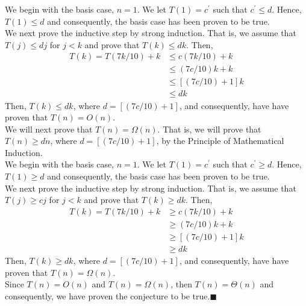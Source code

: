 \documentclass{article}
\begin{document}
\begin{adjustwidth}{2.5em}{0pt}
We begin with the basis case, $n = 1$. We let $T(1) = c^\prime$ such that $c^\prime \leq d$. Hence, $T(1) \leq d$ and consequently, the basis case has been proven to be true.\\

We next prove the inductive step by strong induction. That is, we assume that $T(j) \leq dj$ for $j < k$ and prove that $T(k) \leq dk$. Then,
\begin{align*}
T(k) = T(7k / 10) + k &\leq c(7k / 10) + k\\
&\leq (7c / 10) k + k\\
&\leq [(7c/10) + 1]k\\
&\leq dk
\end{align*}
Then, $T(k) \leq dk$, where $d = [(7c/10) + 1]$, and consequently, have have proven that $T(n) = O(n).$\\

We will next prove that $T(n) = \Omega(n).$ That is, we will prove that $T(n) \geq dn$, where $d = [(7c / 10) + 1]$, by the Principle of Mathematical Induction.\\

We begin with the basis case, $n = 1$. We let $T(1) = c^\prime$ such that $c^\prime \geq d$. Hence, $T(1) \geq d$ and consequently, the basis case has been proven to be true.\\

We next prove the inductive step by strong induction. That is, we assume that $T(j) \geq cj$ for $j < k$ and prove that $T(k) \geq dk$. Then,
\begin{align*}
T(k) = T(7k / 10) + k &\geq c(7k / 10) + k\\
&\geq (7c / 10) k + k\\
&\geq [(7c/10) + 1]k\\
&\geq dk
\end{align*}
Then, $T(k) \geq dk$, where $d = [(7c/10) + 1]$, and consequently, have have proven that $T(n) = \Omega(n).$\\

Since $T(n) = O(n)$ and $T(n) = \Omega(n)$, then $T(n) = \Theta(n)$ and consequently, we have proven the conjecture to be true.\hfill$\blacksquare$\\
\end{adjustwidth}
\end{document}
